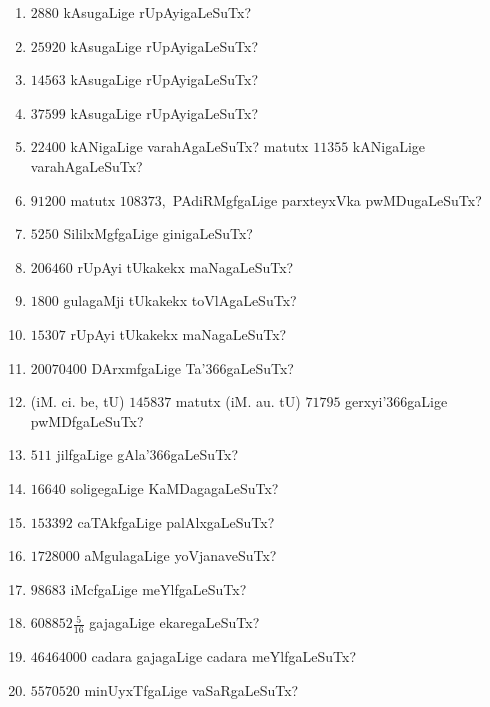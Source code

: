 \begin{enumerate}[\rm(1)]
\item $2880$ kAsugaLige rUpAyigaLeSuTx?

\item $25920$ kAsugaLige rUpAyigaLeSuTx?

\item $14563$ kAsugaLige rUpAyigaLeSuTx?

\item $37599$ kAsugaLige rUpAyigaLeSuTx?

\item $22400$ kANigaLige varahAgaLeSuTx? matutx $11355$ kANigaLige varahAgaLeSuTx?

\item $91200$ matutx $108373,$ PAdiRMgfgaLige parxteyxVka pwMDugaLeSuTx?

\item $5250$ SililxMgfgaLige ginigaLeSuTx?

\item $206460$ rUpAyi tUkakekx maNagaLeSuTx?

\item $1800$ gulagaMji tUkakekx toVlAgaLeSuTx?

\item $15307$ rUpAyi tUkakekx maNagaLeSuTx?

\item $20070400$ DArxmfgaLige Ta\char'366gaLeSuTx?

\item (iM. ci. be, tU) $145837$ matutx (iM. au. tU) $71795$ gerxyi\char'366gaLige pwMDfgaLeSuTx?

\item $511$ jilfgaLige gAla\char'366gaLeSuTx?

\item $16640$ soligegaLige KaMDagagaLeSuTx?

\item $153392$ caTAkfgaLige palAlxgaLeSuTx?

\item $1728000$ aMgulagaLige yoVjanaveSuTx?
 \item $98683$ iMcfgaLige meYlfgaLeSuTx?

\item $608852\frac{5}{16}$ gajagaLige ekaregaLeSuTx?

\item $46464000$ cadara gajagaLige cadara meYlfgaLeSuTx?

\item $5570520$ minUyxTfgaLige vaSaRgaLeSuTx?
\end{enumerate}
